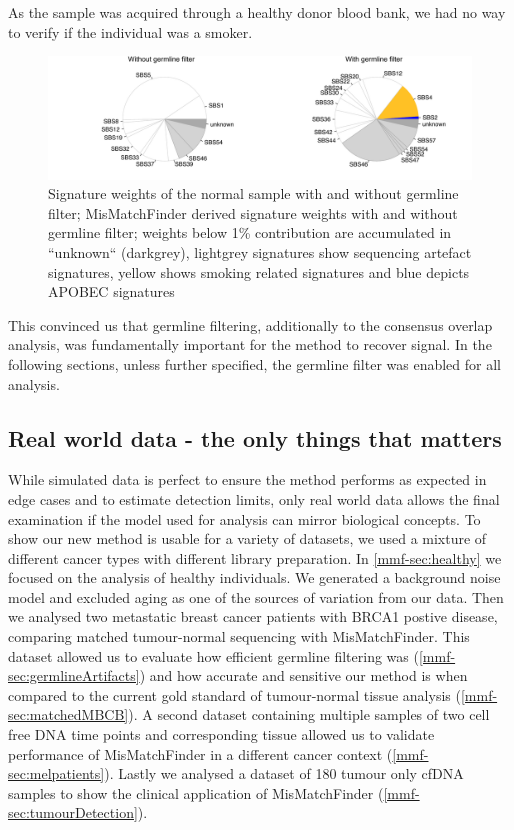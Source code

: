 As the sample was acquired through a healthy donor blood bank, we had no way to verify if the individual was a smoker.

\begin{figure}[ht]
\centering
\includegraphics[width=.99\linewidth]{Figures/MisMatchFinder/noGermlineFilterSignaturesPieChart.pdf}
\caption[Signature weights of the normal sample with and without germline filter]{Signature weights of the normal sample with and without germline filter; MisMatchFinder derived signature weights with and without germline filter; weights below 1\% contribution are accumulated in ``unknown`` (darkgrey), lightgrey signatures show sequencing artefact signatures, yellow shows smoking related signatures and blue depicts APOBEC signatures}\label{fig:mmf-noGermlinePie}
\end{figure}
 
This convinced us that germline filtering, additionally to the consensus overlap analysis, was fundamentally important for the method to recover signal. In the following sections, unless further specified, the germline filter was enabled for all analysis.


\subsection{Real world data - the only things that matters}
\label{mmf-sec:realworld}

While simulated data is perfect to ensure the method performs as expected in edge cases and to estimate detection limits, only real world data allows the final examination if the model used for analysis can mirror biological concepts. To show our new method is usable for a variety of datasets, we used a mixture of different cancer types with different library preparation. In \autoref{mmf-sec:healthy} we focused on the analysis of healthy individuals. We generated a background noise model and excluded aging as one of the sources of variation from our data. Then we analysed two metastatic breast cancer patients with BRCA1 postive disease, comparing matched tumour-normal sequencing with MisMatchFinder. This dataset allowed us to evaluate how efficient germline filtering was (\autoref{mmf-sec:germlineArtifacts}) and how accurate and sensitive our method is when compared to the current gold standard of tumour-normal tissue analysis (\autoref{mmf-sec:matchedMBCB}).
A second dataset containing  multiple samples of two cell free DNA time points and corresponding tissue allowed us to validate performance of MisMatchFinder in a different cancer context (\autoref{mmf-sec:melpatients}). Lastly we analysed a dataset of 180  tumour only cfDNA samples to show the clinical application of MisMatchFinder (\autoref{mmf-sec:tumourDetection}).

